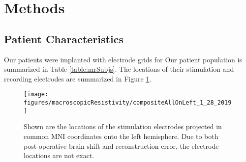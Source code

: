 \section{Methods}

\subsection{Patient Characteristics}

Our patients were implanted with electrode grids for Our  patient population is summarized in Table \ref{table:mrSubjs}. The locations of their stimulation and recording electrodes are summarized in Figure \ref{fig:mrCompositeBrain}.

\begin{figure}[ht]
	\centering
	\texttt{[image: figures/macroscopicResistivity/compositeAllOnLeft\_1\_28\_2019]}
	\caption[Stimulation electrode locations]{Shown are the locations of the stimulation electrodes projected in common MNI coordinates onto the left hemisphere. Due to both post-operative brain shift and reconstruction error, the electrode locations are not exact.}
	\label{fig:mrCompositeBrain}
\end{figure}
%

